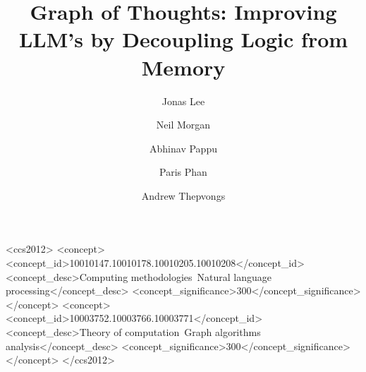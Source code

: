 \documentclass[sigplan,screen]{acmart}
\begin{document}
\title{Graph of Thoughts: Improving LLM's by Decoupling Logic from Memory}


\author{Jonas Lee}

\author{Neil Morgan}

\author{Abhinav Pappu}

\author{Paris Phan}

\author{Andrew Thepvongs}



\renewcommand{\shortauthors}{Lee et al.}


\begin{CCSXML}
<ccs2012>
 <concept>
  <concept_id>10010147.10010178.10010205.10010208</concept_id>
  <concept_desc>Computing methodologies~Natural language processing</concept_desc>
  <concept_significance>300</concept_significance>
 </concept>
 <concept>
  <concept_id>10003752.10003766.10003771</concept_id>
  <concept_desc>Theory of computation~Graph algorithms analysis</concept_desc>
  <concept_significance>300</concept_significance>
 </concept>
</ccs2012>
\end{CCSXML}
\end{document}
